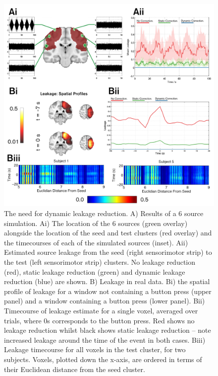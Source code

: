 \begin{figure}
	\begin{center}
		\includegraphics[width=0.95\linewidth]{./images/chapter3/Figure_0.png}
		\caption{The need for dynamic leakage reduction. A) Results of a 6 source simulation. Ai) The location of the 6 sources (green overlay) alongside the location of the seed and test clusters (red overlay) and the timecourses of each of the simulated sources (inset). Aii) Estimated source leakage from the seed (right sensorimotor strip) to the test (left sensorimotor strip) clusters. No leakage reduction (red), static leakage reduction (green) and dynamic leakage reduction (blue) are shown. B) Leakage in real data. Bi) the spatial profile of leakage for a window not containing a button press (upper panel) and a window containing a button press (lower panel). Bii) Timecourse of leakage estimate for a single voxel, averaged over trials, where 0s corresponds to the button press. Red shows no leakage reduction whilst black shows static leakage reduction – note increased leakage around the time of the event in both cases. Biii) Leakage timecourse for all voxels in the test cluster, for two subjects. Voxels, plotted down the x-axis, are ordered in terms of their Euclidean distance from the seed cluster. \label{figure_3_0}}
	\end{center}
\end{figure}

\clearpage

